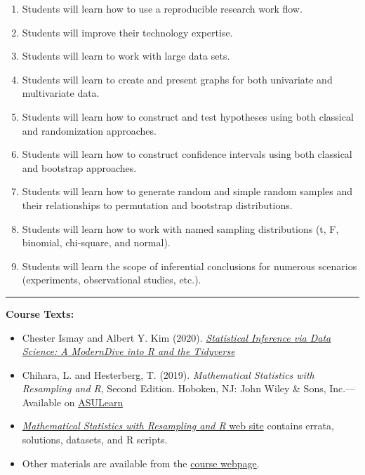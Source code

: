 \documentclass[
]{article}
\providecommand{\tightlist}{%
  \setlength{\itemsep}{0pt}\setlength{\parskip}{0pt}}
\begin{document}
\begin{enumerate}
\def\labelenumi{\arabic{enumi}.}
\tightlist
\item
  Students will learn how to use a reproducible research work flow.
\item
  Students will improve their technology expertise.
\item
  Students will learn to work with large data sets.
\item
  Students will learn to create and present graphs for both univariate
  and multivariate data.
\item
  Students will learn how to construct and test hypotheses using both
  classical and randomization approaches.
\item
  Students will learn how to construct confidence intervals using both
  classical and bootstrap approaches.
\item
  Students will learn how to generate random and simple random samples
  and their relationships to permutation and bootstrap distributions.
\item
  Students will learn how to work with named sampling distributions (t,
  F, binomial, chi-square, and normal).
\item
  Students will learn the scope of inferential conclusions for numerous
  scenarios (experiments, observational studies, etc.).
\end{enumerate}

\begin{center}\rule{0.5\linewidth}{0.5pt}\end{center}

\textbf{Course Texts:}

\begin{itemize}
\item
  Chester Ismay and Albert Y. Kim (2020).
  \href{htpps://moderndive.com}{\emph{Statistical Inference via Data
  Science: A ModernDive into R and the Tidyverse }}
\item
  Chihara, L. and Hesterberg, T. (2019). \emph{Mathematical Statistics
  with Resampling and R}, Second Edition. Hoboken, NJ: John Wiley \&
  Sons, Inc.---Available on
  \href{https://asulearn.appstate.edu/course/view.php?id=167073}{ASULearn}
\item
  \href{https://sites.google.com/site/chiharahesterberg/home}{\emph{Mathematical
  Statistics with Resampling and R} web site} contains errata,
  solutions, datasets, and R scripts.
\item
  Other materials are available from the
  \href{https://alanarnholt.github.io/STT3850/}{course webpage}.
\end{itemize}
\end{document}
